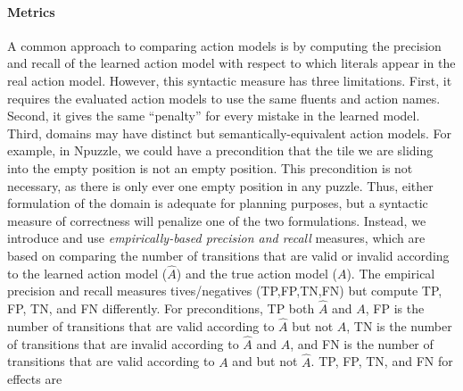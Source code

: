 \documentclass[letterpaper]{article} %
\begin{document}
\paragraph{Metrics}
A common approach to comparing action models is by computing the precision and recall of the learned action model with respect to which literals appear in the real action model. However, this syntactic measure has three limitations. First, it requires the evaluated action models to use the same fluents and action names. Second, it gives the same ``penalty'' for every mistake in the learned model. Third, domains may have distinct but semantically-equivalent action models. For example, in Npuzzle, we could have a precondition that the tile we are sliding into the empty position is not an empty position. This precondition is not necessary, as there is only ever one empty position in any puzzle. Thus, either formulation of the domain is adequate for planning purposes, but a syntactic measure of correctness will penalize one of the two formulations. Instead, we introduce and use
\textit{empirically-based precision and recall} measures, which are based on comparing the number of transitions that are valid or invalid according to the learned action model ($\hat{A}$) and the true action model ($A$).
The empirical precision and recall measures tives/negatives (TP,FP,TN,FN)
but compute TP, FP, TN, and FN differently.
For preconditions, TP  both $\hat{A}$ and $A$,
FP is the number of transitions that are valid according to $\hat{A}$ but not $A$,
TN is the number of transitions that are invalid according to $\hat{A}$ and $A$, and
FN is the number of transitions that are valid according to $A$ and but not $\hat{A}$.
TP, FP, TN, and FN for effects are 
\end{document}

